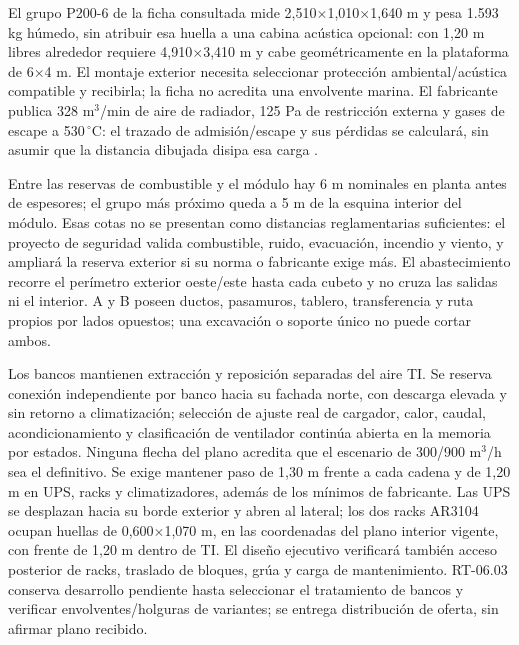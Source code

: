 El grupo P200-6 de la ficha consultada mide 2,510$\times$1,010$\times$1,640 m y pesa 1.593 kg húmedo, sin atribuir esa huella a una cabina acústica opcional: con 1,20 m libres alrededor requiere 4,910$\times$3,410 m y cabe geométricamente en la plataforma de 6$\times$4 m. El montaje exterior necesita seleccionar protección ambiental/acústica compatible y recibirla; la ficha no acredita una envolvente marina. El fabricante publica 328 m$^3$/min de aire de radiador, 125 Pa de restricción externa y gases de escape a 530\,$^{\circ}$C: el trazado de admisión/escape y sus pérdidas se calculará, sin asumir que la distancia dibujada disipa esa carga \parencite[pp.~1--3]{p7-fg-p200-ficha}.

Entre las reservas de combustible y el módulo hay 6 m nominales en planta antes de espesores; el grupo más próximo queda a 5 m de la esquina interior del módulo. Esas cotas no se presentan como distancias reglamentarias suficientes: el proyecto de seguridad valida combustible, ruido, evacuación, incendio y viento, y ampliará la reserva exterior si su norma o fabricante exige más. El abastecimiento recorre el perímetro exterior oeste/este hasta cada cubeto y no cruza las salidas ni el interior. A y B poseen ductos, pasamuros, tablero, transferencia y ruta propios por lados opuestos; una excavación o soporte único no puede cortar ambos.

Los bancos mantienen extracción y reposición separadas del aire TI. Se reserva conexión independiente por banco hacia su fachada norte, con descarga elevada y sin retorno a climatización; selección de ajuste real de cargador, calor, caudal, acondicionamiento y clasificación de ventilador continúa abierta en la memoria por estados. Ninguna flecha del plano acredita que el escenario de 300/900 m$^3$/h sea el definitivo. Se exige mantener paso de 1,30 m frente a cada cadena y de 1,20 m en UPS, racks y climatizadores, además de los mínimos de fabricante. Las UPS se desplazan hacia su borde exterior y abren al lateral; los dos racks AR3104 ocupan huellas de 0,600$\times$1,070 m, en las coordenadas del plano interior vigente, con frente de 1,20 m dentro de TI. El diseño ejecutivo verificará también acceso posterior de racks, traslado de bloques, grúa y carga de mantenimiento. RT-06.03 conserva desarrollo pendiente hasta seleccionar el tratamiento de bancos y verificar envolventes/holguras de variantes; se entrega distribución de oferta, sin afirmar plano recibido.

